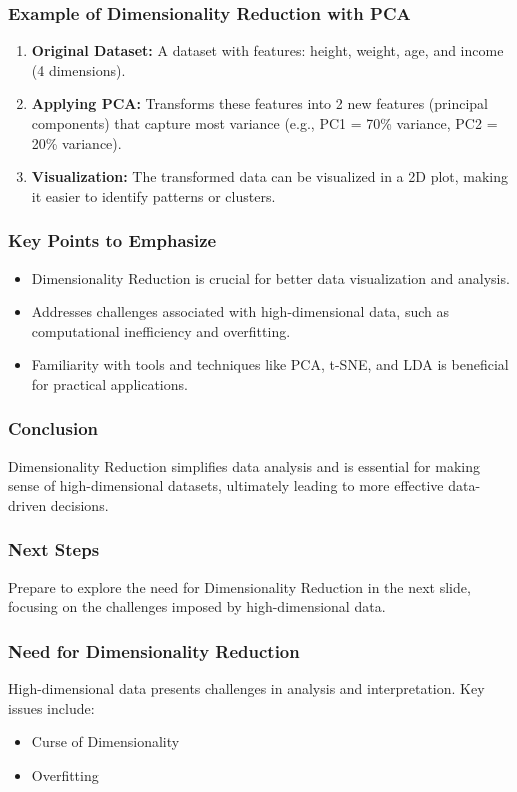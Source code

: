 \documentclass{beamer}
\begin{document}
\begin{frame}[fragile]
    \frametitle{Example of Dimensionality Reduction with PCA}
    \begin{enumerate}
        \item \textbf{Original Dataset:} A dataset with features: height, weight, age, and income (4 dimensions).
        \item \textbf{Applying PCA:} Transforms these features into 2 new features (principal components) that capture most variance (e.g., PC1 = 70\% variance, PC2 = 20\% variance).
        \item \textbf{Visualization:} The transformed data can be visualized in a 2D plot, making it easier to identify patterns or clusters.
    \end{enumerate}
\end{frame}

\begin{frame}[fragile]
    \frametitle{Key Points to Emphasize}
    \begin{itemize}
        \item Dimensionality Reduction is crucial for better data visualization and analysis.
        \item Addresses challenges associated with high-dimensional data, such as computational inefficiency and overfitting.
        \item Familiarity with tools and techniques like PCA, t-SNE, and LDA is beneficial for practical applications.
    \end{itemize}
\end{frame}

\begin{frame}[fragile]
    \frametitle{Conclusion}
    Dimensionality Reduction simplifies data analysis and is essential for making sense of high-dimensional datasets, ultimately leading to more effective data-driven decisions.
\end{frame}

\begin{frame}[fragile]
    \frametitle{Next Steps}
    \begin{block}{}
        Prepare to explore the need for Dimensionality Reduction in the next slide, focusing on the challenges imposed by high-dimensional data.
    \end{block}
\end{frame}

\begin{frame}[fragile]
    \frametitle{Need for Dimensionality Reduction}
    High-dimensional data presents challenges in analysis and interpretation. Key issues include:
    \begin{itemize}
        \item Curse of Dimensionality
        \item Overfitting
    \end{itemize}
\end{frame}
\end{document}
